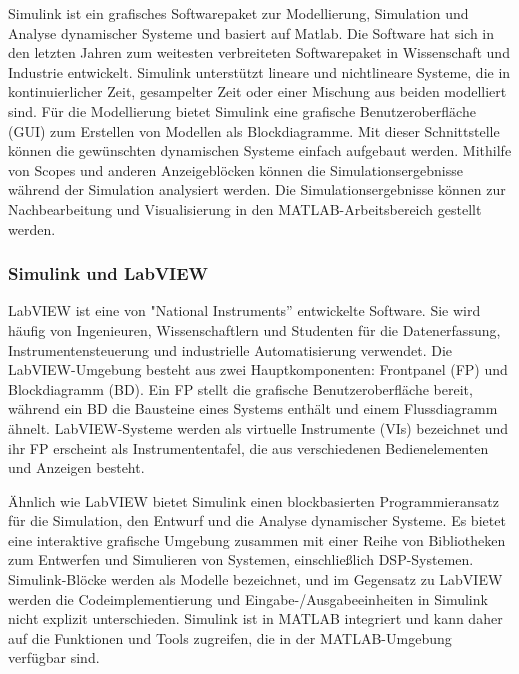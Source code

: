 Simulink ist ein grafisches Softwarepaket zur Modellierung, Simulation und Analyse dynamischer Systeme und basiert auf Matlab. 
Die Software hat sich in den letzten Jahren zum weitesten verbreiteten Softwarepaket in Wissenschaft und Industrie entwickelt.
Simulink unterstützt lineare und nichtlineare Systeme, die in kontinuierlicher Zeit, gesampelter Zeit oder einer Mischung aus beiden modelliert sind. Für die Modellierung bietet Simulink eine grafische Benutzeroberfläche (GUI) zum Erstellen von Modellen als Blockdiagramme. Mit dieser Schnittstelle können die gewünschten dynamischen Systeme einfach aufgebaut werden. Mithilfe von Scopes und anderen Anzeigeblöcken können die Simulationsergebnisse während der Simulation analysiert werden. Die Simulationsergebnisse können zur Nachbearbeitung und Visualisierung in den MATLAB-Arbeitsbereich gestellt werden. \citep{Iov2004}\citep{Karris2008}\\



\subsubsection{Simulink und LabVIEW} 
LabVIEW ist eine von "National Instruments'' entwickelte Software. Sie wird häufig von Ingenieuren, Wissenschaftlern und Studenten für die Datenerfassung, Instrumentensteuerung und industrielle Automatisierung verwendet. Die LabVIEW-Umgebung besteht aus zwei Hauptkomponenten: Frontpanel (FP) und Blockdiagramm (BD). Ein FP stellt die grafische Benutzeroberfläche bereit, während ein BD die Bausteine eines Systems enthält und einem Flussdiagramm ähnelt. LabVIEW-Systeme werden als virtuelle Instrumente (VIs) bezeichnet und ihr FP erscheint als Instrumententafel, die aus verschiedenen Bedienelementen und Anzeigen besteht.

Ähnlich wie LabVIEW bietet Simulink einen blockbasierten Programmieransatz für die Simulation, den Entwurf und die Analyse dynamischer Systeme. Es bietet eine interaktive grafische Umgebung zusammen mit einer Reihe von Bibliotheken zum Entwerfen und Simulieren von Systemen, einschließlich DSP-Systemen. Simulink-Blöcke werden als Modelle bezeichnet, und im Gegensatz zu LabVIEW werden die Codeimplementierung und Eingabe-/Ausgabeeinheiten in Simulink nicht explizit unterschieden. Simulink ist in MATLAB integriert und kann daher auf die Funktionen und Tools zugreifen, die in der MATLAB-Umgebung verfügbar sind. \citep{Kehtarnavaz2006} \citep{Cansalar2015}\\

